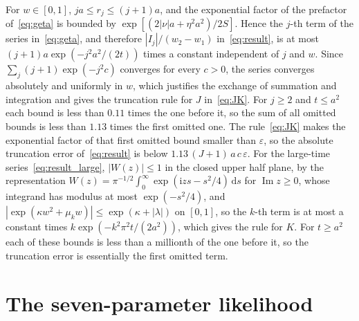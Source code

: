 \documentclass[final,5p,times,twocolumn,authoryear]{elsarticle}
\newcommand{\dd}{\,\mathrm{d}}
\newcommand{\I}{\mathrm{i}}
\begin{document}
For $w \in [0, 1]$, $ja \le r_j \le (j+1)a$, and the exponential factor of the prefactor of~\eqref{eq:geta} is bounded by $\exp[(2|\nu|a + \eta^2 a^2)/2S]$. Hence the $j$-th term of the series in~\eqref{eq:geta}, and therefore $|I_j|/(w_2 - w_1)$ in~\eqref{eq:result}, is at most $(j+1)a\exp(-j^2 a^2/(2t))$ times a constant independent of $j$ and $w$. Since $\sum_j (j+1)\exp(-j^2 c)$ converges for every $c > 0$, the series converges absolutely and uniformly in $w$, which justifies the exchange of summation and integration and gives the truncation rule for $J$ in~\eqref{eq:JK}. For $j \ge 2$ and $t \le a^2$ each bound is less than $0.11$ times the one before it, so the sum of all omitted bounds is less than $1.13$ times the first omitted one. The rule~\eqref{eq:JK} makes the exponential factor of that first omitted bound smaller than $\varepsilon$, so the absolute truncation error of~\eqref{eq:result} is below $1.13\,(J+1)\,a\,c\,\varepsilon$. For the large-time series~\eqref{eq:result_large}, $|W(z)| \le 1$ in the closed upper half plane, by the representation $W(z) = \pi^{-1/2}\int_0^\infty \exp(\I z s - s^2/4)\dd s$ for $\operatorname{Im} z \ge 0$, whose integrand has modulus at most $\exp(-s^2/4)$, and $|\exp(\kappa w^2 + \mu_k w)| \le \exp(\kappa + |\lambda|)$ on $[0,1]$, so the $k$-th term is at most a constant times $k\exp(-k^2\pi^2 t/(2a^2))$, which gives the rule for $K$. For $t \ge a^2$ each of these bounds is less than a millionth of the one before it, so the truncation error is essentially the first omitted term.

\section{The seven-parameter likelihood}
\label{app:seven}
\end{document}

